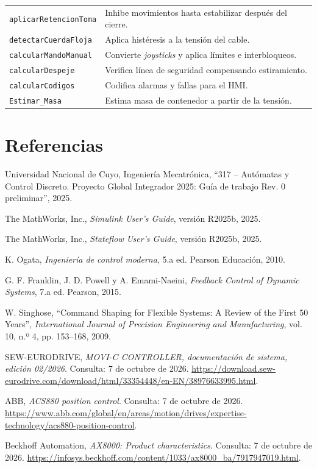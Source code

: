 \documentclass[a4paper,10pt,onecolumn,journal]{ieeeconf}
\numberwithin{equation}{section}
\begin{document}
\begin{table}[H]
\begin{tabular}{L{5.2cm} L{8.5cm}}
\texttt{aplicarRetencionToma} & Inhibe movimientos hasta estabilizar después del cierre.\\
\texttt{detectarCuerdaFloja} & Aplica histéresis a la tensión del cable.\\
\texttt{calcularMandoManual} & Convierte \textit{joysticks} y aplica límites e interbloqueos.\\
\texttt{calcularDespeje} & Verifica línea de seguridad compensando estiramiento.\\
\texttt{calcularCodigos} & Codifica alarmas y fallas para el HMI.\\
\texttt{Estimar\_Masa} & Estima masa de contenedor a partir de la tensión.\\
\bottomrule
\end{tabular}
\end{table}

\par
{}
\section{Referencias}
\thispagestyle{mystyle}
{\small
\noindent [1] Universidad Nacional de Cuyo, Ingeniería Mecatrónica, ``317 -- Autómatas y Control Discreto. Proyecto Global Integrador 2025: Guía de trabajo Rev. 0 preliminar'', 2025.\par
\noindent [2] The MathWorks, Inc., \textit{Simulink User's Guide}, versión R2025b, 2025.\par
\noindent [3] The MathWorks, Inc., \textit{Stateflow User's Guide}, versión R2025b, 2025.\par
\noindent [4] K. Ogata, \textit{Ingeniería de control moderna}, 5.a ed. Pearson Educación, 2010.\par
\noindent [5] G. F. Franklin, J. D. Powell y A. Emami-Naeini, \textit{Feedback Control of Dynamic Systems}, 7.a ed. Pearson, 2015.\par
\noindent [6] W. Singhose, ``Command Shaping for Flexible Systems: A Review of the First 50 Years'', \textit{International Journal of Precision Engineering and Manufacturing}, vol. 10, n.º 4, pp. 153--168, 2009.\par

\noindent [7] SEW-EURODRIVE, \textit{MOVI-C CONTROLLER, documentación de sistema, edición 02/2026}. Consulta: 7 de octubre de 2026. \url{https://download.sew-eurodrive.com/download/html/33354448/en-EN/38976633995.html}.\par
\noindent [8] ABB, \textit{ACS880 position control}. Consulta: 7 de octubre de 2026. \url{https://www.abb.com/global/en/areas/motion/drives/expertise-technology/acs880-position-control}.\par
\noindent [9] Beckhoff Automation, \textit{AX8000: Product characteristics}. Consulta: 7 de octubre de 2026. \url{https://infosys.beckhoff.com/content/1033/ax8000_ba/7917947019.html}.\par
}
\end{document}
